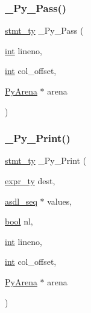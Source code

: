 \subsubsection{\texorpdfstring{\_Py\_Pass()}{\_Py\_Pass()}}
{\footnotesize\ttfamily \mbox{\hyperlink{_python-ast_8h_a39618071027b661bc03e8916e664e1a7}{stmt\+\_\+ty}} \+\_\+\+Py\+\_\+\+Pass (\begin{DoxyParamCaption}\item[{\mbox{\hyperlink{warnings_8h_a74f207b5aa4ba51c3a2ad59b219a423b}{int}}}]{lineno,  }\item[{\mbox{\hyperlink{warnings_8h_a74f207b5aa4ba51c3a2ad59b219a423b}{int}}}]{col\+\_\+offset,  }\item[{\mbox{\hyperlink{pyarena_8h_a9edeb357fbb27333471022a0975adb7a}{Py\+Arena}} $\ast$}]{arena }\end{DoxyParamCaption})}

\mbox{\label{_python-ast_8h_ab5588d69d529b0cf9ef93fe25435f521}} 
\subsubsection{\texorpdfstring{\_Py\_Print()}{\_Py\_Print()}}
{\footnotesize\ttfamily \mbox{\hyperlink{_python-ast_8h_a39618071027b661bc03e8916e664e1a7}{stmt\+\_\+ty}} \+\_\+\+Py\+\_\+\+Print (\begin{DoxyParamCaption}\item[{\mbox{\hyperlink{_python-ast_8h_a56d3705e020a071405094a220c4592bd}{expr\+\_\+ty}}}]{dest,  }\item[{\mbox{\hyperlink{structasdl__seq}{asdl\+\_\+seq}} $\ast$}]{values,  }\item[{\mbox{\hyperlink{asdl_8h_af6a258d8f3ee5206d682d799316314b1}{bool}}}]{nl,  }\item[{\mbox{\hyperlink{warnings_8h_a74f207b5aa4ba51c3a2ad59b219a423b}{int}}}]{lineno,  }\item[{\mbox{\hyperlink{warnings_8h_a74f207b5aa4ba51c3a2ad59b219a423b}{int}}}]{col\+\_\+offset,  }\item[{\mbox{\hyperlink{pyarena_8h_a9edeb357fbb27333471022a0975adb7a}{Py\+Arena}} $\ast$}]{arena }\end{DoxyParamCaption})}

\mbox{\label{_python-ast_8h_adfc8c2a87f1fe7625435a22b28d1fc7f}} 

